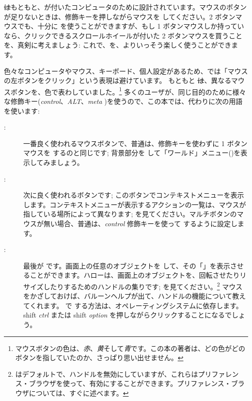 \documentclass[a4paper,10pt,twoside]{book}
\begin{document}
\st はもともと、が付いたコンピュータのために設計されています。マウスのボタンが足りないときは、修飾キーを押しながらマウスを \click してください。2 ボタンマウスでも、十分に \pharo を使うことができますが、もし 1 ボタンマウスしか持っていなら、クリックできるスクロールホイールが付いた 2 ボタンマウスを買うことを、真剣に考えましょう: これで、\pharo を、よりいっそう楽しく使うことができます。

色々なコンピュータやマウス、キーボード、個人設定があるため、\pharo では「マウスの左ボタンをクリック」という表現は避けています。
もともと \st は、異なるマウスボタンを、色で表わしていました。\footnote{マウスボタンの色は、\emph{赤}、\emph{黄}そして\emph{青}です。この本の著者は、どの色がどのボタンを指していたのか、さっぱり思い出せません。}
多くのユーザが、同じ目的のために様々な修飾キー(\emph{control}、\emph{ALT}、\emph{meta} \etc)を使うので、この本では、代わりに次の用語を使います:
\begin{description}
\item [\click:] 一番良く使われるマウスボタンで、普通は、修飾キーを使わずに 1 ボタンマウスを \click するのと同じです; 背景部分を \click して「ワールド」メニュー()を表示してみましょう。
\item [\actclick:] 次に良く使われるボタンです; このボタンでコンテキストメニューを表示します。コンテキストメニューが表示するアクションの一覧は、マウスが指している場所によって異なります; を見てください。マルチボタンのマウスが無い場合、普通は、\emph{control} 修飾キーを使って \actclick するように設定します。
\item [\metaclick:] 最後が \metaclick です。画面上の任意のオブジェクトを \metaclick して、その「」を表示させることができます。ハローは、画面上のオブジェクトを、回転させたりリサイズしたりするためのハンドルの集りです;  を見てください。\footnote{\pharo はデフォルトで、ハンドルを無効にしていますが、これらはプリファレンス・ブラウザを使って、有効にすることができます。プリファレンス・ブラウザについては、すぐに述べます。}
マウスをかざしておけば、バルーンヘルプが出て、ハンドルの機能について教えてくれます。
\pharo で \metaclick する方法は、オペレーティングシステムに依存します。
{\sc shift} \emph{ctrl} または {\sc shift} \emph{option} を押しながらクリックすることになるでしょう。
\end{description}
\end{document}
